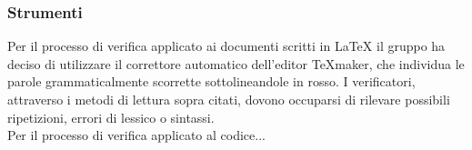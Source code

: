 \subsubsection{Strumenti}
Per il processo di verifica applicato ai documenti scritti in \LaTeX{} il gruppo ha deciso di utilizzare il correttore automatico dell'editor TeXmaker, che individua le parole grammaticalmente scorrette sottolineandole in rosso. I verificatori, attraverso i metodi di lettura sopra citati, dovono occuparsi di rilevare possibili ripetizioni, errori di lessico o sintassi.  \\
\linebreak
Per il processo di verifica applicato al codice...
















